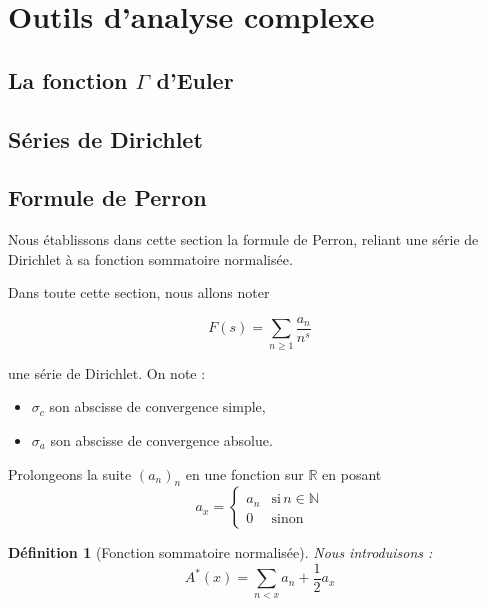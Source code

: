 \documentclass[french]{report}
\newtheorem{definition}[theorem]{Définition}
\begin{document}
\section{Outils d'analyse complexe}

\subsection{La fonction $\Gamma$ d'Euler}

\subsection{Séries de Dirichlet}

\subsection{Formule de Perron}

Nous établissons dans cette section la formule de Perron, reliant une série de Dirichlet à sa fonction sommatoire normalisée.

Dans toute cette section, nous allons noter

\[ F(s) =\sum_{n\geq1}\frac{a_n}{n^s}\]

une série de Dirichlet. On note :
\begin{itemize}
  \item $\sigma_c$ son abscisse de convergence simple,
  \item $\sigma_a$ son abscisse de convergence absolue.
\end{itemize}

Prolongeons la suite $(a_n)_n$ en une fonction sur $\mathbb{R}$ en posant
\[
  a_x=
  \begin{cases}
    a_n & \text{si}\,n\in\mathbb{N} \\
    0  & \text{sinon}
  \end{cases}
\]
\begin{definition}[Fonction sommatoire normalisée]
  Nous introduisons :
  \[ A^*(x) = \sum_{n<x}a_n + \frac{1}{2}a_x \]
\end{definition}
\end{document}

